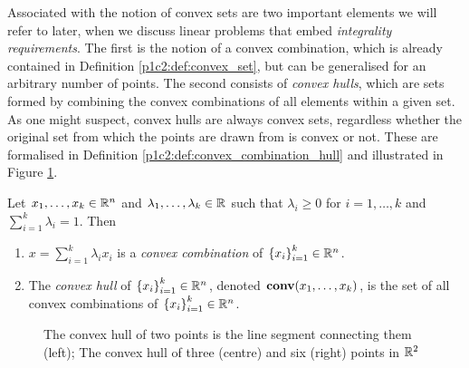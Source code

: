 Associated with the notion of convex sets are two important elements we will refer to later, when we discuss linear problems that embed \emph{integrality requirements}. The first is the notion of a convex combination, which is already contained in Definition \ref{p1c2:def:convex_set}, but can be generalised for an arbitrary number of points. The second consists of \emph{convex hulls}, which are sets formed by combining the convex combinations of all elements within a given set. As one might suspect, convex hulls are always convex sets, regardless whether the original set from which the points are drawn from is convex or not. These are formalised in Definition \ref{p1c2:def:convex_combination_hull} and illustrated in Figure \ref{p1c2:fig:convex_hulls}.

\begin{definition} \label{p1c2:def:convex_combination_hull}
	Let $x_1, \dots, x_k \in \mathbb{R}^n$ and $\lambda_1,\dots, \lambda_k \in \mathbb{R}$ such that $\lambda_i \geq 0$ for $i = 1, \dots, k$ and $\sum_{i=1}^k \lambda_i = 1$. Then
	\begin{enumerate}
		\item $x = \sum_{i=1}^k \lambda_i x_i$ is a \emph{convex combination} of $\left\{ x_i \right \}_{i=1}^k \in \mathbb{R}^n$.
		\item The \emph{convex hull} of $\left\{ x_i \right \}_{i=1}^k \in \mathbb{R}^n$, denoted $\mathop{\bf conv}(x_1, \dots, x_k)$, is the set of all convex combinations of $\left\{ x_i \right \}_{i=1}^k \in \mathbb{R}^n$.
	\end{enumerate}		
\end{definition}

\begin{figure}
	\vspace{-6pt}
	\caption{The convex hull of two points is the line segment connecting them (left); The convex hull of three (centre) and six (right) points in $\mathbb{R}^2$} \label{p1c2:fig:convex_hulls}
\end{figure}	

